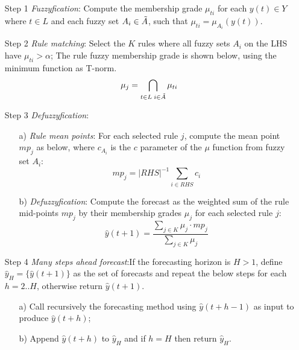 \begin{enumerate}
\item [Step 1] \textit{Fuzzyfication}: Compute the membership grade $\mu_{ti}$ for each $y(t) \in Y$ where $t \in L$ and each fuzzy set $A_i \in \Tilde{A}$, such that $\mu_{ti} = \mu_{A_i}(y(t))$. 
\item [Step 2] \textit{Rule matching}: Select the $K$ rules where all fuzzy sets $A_i$ on the LHS have $\mu_{ti} > \alpha$; The rule fuzzy membership grade is shown below, using the minimum function as T-norm.
\begin{equation}
    \mu_j = \bigcap_{t\in L\; i \in \Tilde{A}} \mu_{ti}
\end{equation}

\item [Step 3] \textit{Defuzzyfication}:
\begin{enumerate}
\item [a)] \textit{Rule mean points}: For each selected rule $j$, compute the mean point $mp_j$ as below, where $c_{A_i}$ is the $c$ parameter of the $\mu$ function from fuzzy set $A_i$:
\begin{equation}
mp_j = |RHS|^{-1}\sum_{i \in RHS} c_i
\end{equation}
\item [b)] \textit{Defuzzyfication}: Compute the forecast as the weighted sum of the rule mid-points $mp_j$ by their membership grades $\mu_j$ for each selected rule $j$:
\begin{equation}
\hat{y}(t+1) = \frac{\sum_{j \in K} \mu_j \cdot mp_j}{\sum_{j \in K} \mu_j}
\end{equation}
\end{enumerate}
\item[Step 4] \textit{Many steps ahead forecast}:If the forecasting horizon is $H > 1$, define $\hat{y}_H = \{\hat{y}(t+1)\}$ as the set of forecasts and repeat the below steps for each $h=2..H$, otherwise return  $\hat{y}(t+1)$.
\begin{enumerate}
    \item[a)]  Call recursively the forecasting method using $\hat{y}(t+h-1)$ as input to produce $\hat{y}(t+h)$;
    \item[b)] Append $\hat{y}(t+h)$ to $\hat{y}_H$ and if $h = H$ then return $\hat{y}_H$.
\end{enumerate}
\end{enumerate}



%
